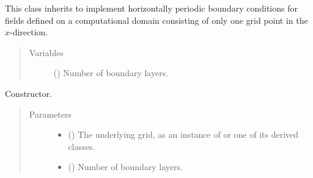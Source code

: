 \documentclass[letterpaper,10pt,english]{sphinxmanual}
\begin{document}

\begin{fulllineitems}
\label{\detokenize{api:dycore.horizontal_boundary.PeriodicYZ}}
This class inherits {\hyperref[\detokenize{api:dycore.horizontal_boundary.HorizontalBoundary}]{}} to implement horizontally periodic boundary conditions for fields
defined on a computational domain consisting of only one grid point in the \(x\)-direction.
\begin{quote}\begin{description}
\item[{Variables}] \leavevmode
{\hyperref[\detokenize{api:dycore.prognostic_isentropic.PrognosticIsentropic.nb}]{}} () \textendash{} Number of boundary layers.

\end{description}\end{quote}

\begin{fulllineitems}
\label{\detokenize{api:dycore.horizontal_boundary.PeriodicYZ.__init__}}
Constructor.
\begin{quote}\begin{description}
\item[{Parameters}] \leavevmode\begin{itemize}
\item {} 
 () \textendash{} The underlying grid, as an instance of {\hyperref[\detokenize{api:grids.grid_xyz.GridXYZ}]{}} or one of its derived classes.

\item {} 
 () \textendash{} Number of boundary layers.

\end{itemize}

\end{description}\end{quote}

\end{fulllineitems}


\end{fulllineitems}
\end{document}

